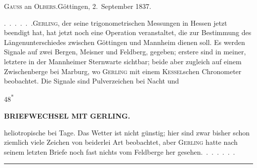 \begin{center}
\textsc{Gauss} an \textsc{Olbers}.\quad Göttingen, 2.~September 1837.
\end{center}

\par\noindent\hspace*{\parindent}\mbox{.\ .\ .\ .\ .\ .}\quad \textsc{Gerling}, der seine trigonometrischen Messungen in Hessen jetzt be\-endigt hat, hat jetzt noch eine Operation veranstaltet, die zur Bestimmung des Längenunterschiedes zwischen Göttingen und Mannheim dienen soll.
Es werden Signale auf zwei Bergen, Meisner und Feldberg, gegeben; erstere sind in meiner, letztere in der Mannheimer Sternwarte sichtbar; beide aber zugleich auf einem Zwischenberge bei Marburg, wo \textsc{Gerling} mit einem \textsc{Kessel}\-schen Chronometer beobachtet.
Die Signale sind Pulverzeichen bei Nacht und
\par\smallskip\noindent\hfill{\footnotesize 48\textsuperscript{*}}\hspace*{.12\linewidth}\par
\clearpage
\noindent{}\hfill{\small\textbf{BRIEFWECHSEL MIT GERLING.}}\hfill\null\par\medskip
\noindent heliotropische bei Tage.
Das Wetter ist nicht günstig; hier sind zwar bisher schon ziemlich viele Zeichen von beiderlei Art beobachtet, aber \textsc{Gerling} hatte nach seinem letzten Briefe noch fast nichts vom Feldberge her gesehen.\ \mbox{.\ .\ .\ .\ .\ .}

\begin{center}\rule{.24\linewidth}{.4pt}\end{center}

